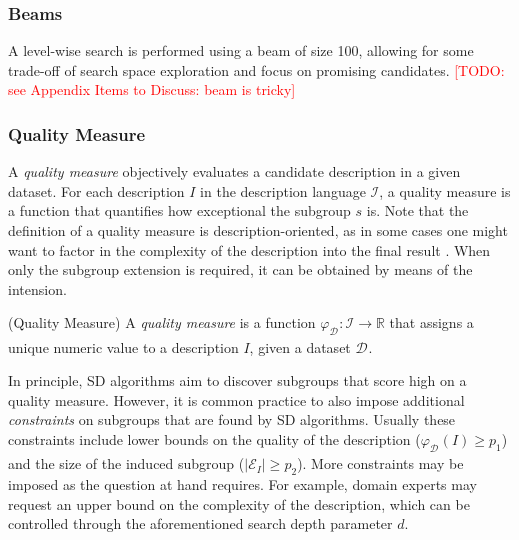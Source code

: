 \documentclass[smallextended]{svjour3}
\newcommand{\todo}[1]{\textcolor{red}{[TODO: #1]}}
\newcommand{\ds}[1]{\mathcal{D}_{#1}}
\newcommand{\extension}[1]{\mathcal{E}_{#1}}
\newcommand{\intension}{I}
\newcommand{\sd}{SD}
\begin{document}
\subsubsection{Beams}
\label{section:beams}

A level-wise search is performed using a beam of size 100, allowing for some trade-off of search space exploration and focus on promising candidates.
\todo{see Appendix Items to Discuss: beam is tricky}


\subsubsection{Quality Measure}
\label{section:quality-measure}

A \emph{quality measure} objectively evaluates a candidate description in a given dataset.
For each description $\intension{}$ in the description language $\mathcal{\intension{}}$, a quality measure is a function that quantifies how exceptional the subgroup $s$ is.
Note that the definition of a quality measure is description-oriented, as in some cases one might want to factor in the complexity of the description into the final result \cite{leeuwen:2012}.
When only the subgroup extension is required, it can be obtained by means of the intension.

\begin{definition}{(Quality Measure)}
\label{definition:quality-measure}
  A \emph{quality measure} is a function $\varphi_{\ds{}}: \mathcal{\intension{}} \to \mathbb{R}$ that assigns a unique numeric value to a description $\intension{}$, given a dataset $\ds{}$.
\end{definition}

In principle, \sd{} algorithms aim to discover subgroups that score high on a quality measure.
However, it is common practice to also impose additional {\em constraints} on subgroups that are found by \sd{} algorithms.
Usually these constraints include lower bounds on the quality of the description ($\varphi_{\ds{}}(\intension{}) \geq p_1$) and the size of the induced subgroup ($\left|\extension{\intension{}}\right| \geq p_2$).
More constraints may be imposed as the question at hand requires.
For example, domain experts may request an upper bound on the complexity of the description, which can be controlled through the aforementioned search depth parameter $d$.
\end{document}

